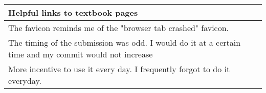 \begin{longtable}{|p{1\linewidth}|}
		\hline
		Helpful links to textbook pages                                                                                                                                                                                                                                                                                                                                                                                                                                                                                                                                                                                                                                                                  \\
		\hline
		The favicon reminds me of the "browser tab crashed" favicon.                                                                                                                                                                                                                                                                                                                                                                                                                                                                                                                                                                                                                                     \\
		\hline
		The timing of the submission was odd. I would do it at a certain time and my commit would not increase                                                                                                                                                                                                                                                                                                                                                                                                                                                                                                                                                                                           \\
		\hline
		More incentive to use it every day. I frequently forgot to do it everyday.                                                                                                                                                                                                                                                                                                                                                                                                                                                                                                                                                                                                                       \\

\end{longtable}
